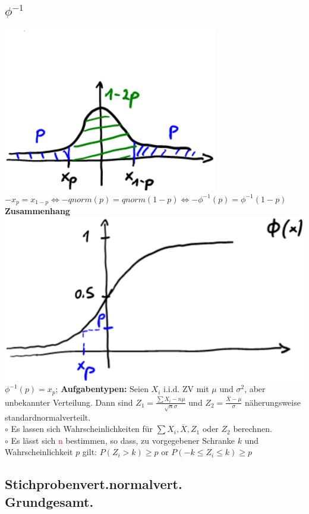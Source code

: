 \subsection{$\phi^{-1}$}
\includegraphics[scale=0.25]{./pic/ZGWPhi-1Verteilung.png}
$  -x_{p} = x_{1-p} \Leftrightarrow -qnorm(p) = qnorm(1-p) \Leftrightarrow -\phi^{-1}(p) = \phi^{-1}(1-p) $
\textbf{Zusammenhang}
\includegraphics[scale=0.25]{./pic/ZGWSigmoidFunction.png} $ \phi^{-1}(p) = x_{p} $; 
\textbf{Aufgabentypen:} 
Seien $ X_{i} $ i.i.d. ZV mit $\mu$ und $ \sigma^2 $, aber unbekannter Verteilung. Dann sind $ Z_{1} = \frac{\sum X_{i}-n\mu}{\sqrt{n}\sigma}$ und $Z_{2} = \frac{\overline{X}-\mu}{\sigma} $  näherungsweise standardnormalverteilt.\\
	$\circ$ Es lassen sich Wahrscheinlichkeiten für $\sum X_{i}, \overline{X}, Z_{1}$ oder $ Z_{2} $ berechnen.\\
	$\circ$ Es lässt sich \textcolor{red}{n} bestimmen, so dass, zu vorgegebener Schranke $ k $ und Wahrscheinlichkeit $ p $ gilt: $ P(Z_{i} > k) \geq p $ or $ P(-k \leq Z_{i} \leq k) \geq p $
\subsection{Stichprobenvert.normalvert.\\Grundgesamt.}
